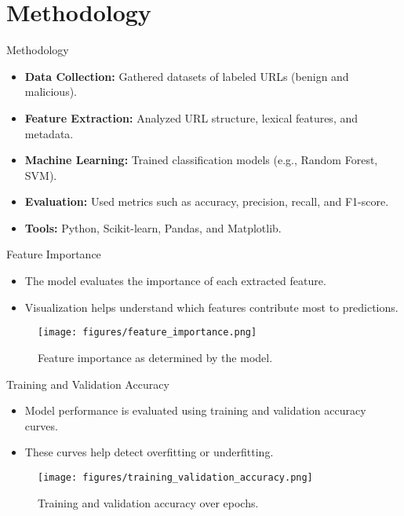 \documentclass{beamer}
\begin{document}
\section{Methodology}
\begin{frame}{Methodology}
  \begin{itemize}
    \item \textbf{Data Collection:} Gathered datasets of labeled URLs (benign and malicious).
    \item \textbf{Feature Extraction:} Analyzed URL structure, lexical features, and metadata.
    \item \textbf{Machine Learning:} Trained classification models (e.g., Random Forest, SVM).
    \item \textbf{Evaluation:} Used metrics such as accuracy, precision, recall, and F1-score.
    \item \textbf{Tools:} Python, Scikit-learn, Pandas, and Matplotlib.
  \end{itemize}
\end{frame}

\begin{frame}{Feature Importance}
    \begin{itemize}
        \item The model evaluates the importance of each extracted feature.
        \item Visualization helps understand which features contribute most to predictions.
    \end{itemize}
    \begin{figure}[h]
        \centering
        \texttt{[image: figures/feature\_importance.png]} %
        \caption{Feature importance as determined by the model.}
    \end{figure}
\end{frame}

\begin{frame}{Training and Validation Accuracy}
    \begin{itemize}
        \item Model performance is evaluated using training and validation accuracy curves.
        \item These curves help detect overfitting or underfitting.
    \end{itemize}
    \begin{figure}[h]
        \centering
        \texttt{[image: figures/training\_validation\_accuracy.png]} %
        \caption{Training and validation accuracy over epochs.}
    \end{figure}
\end{frame}
\end{document}
